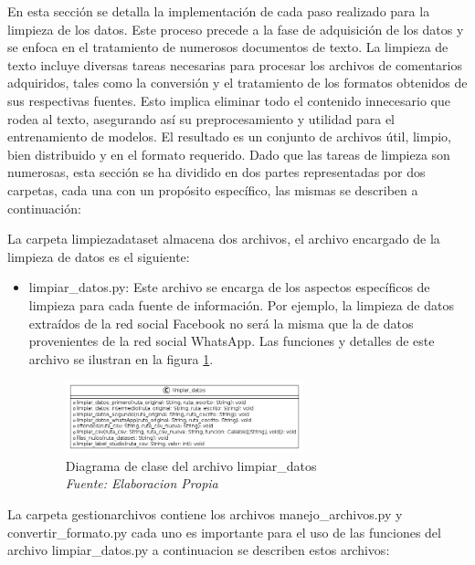 En esta sección se detalla la implementación de cada paso realizado para la limpieza de los datos. Este proceso precede a la fase de adquisición de los datos y se enfoca en el tratamiento de numerosos documentos de texto. La limpieza de texto incluye diversas tareas necesarias para procesar los archivos de comentarios adquiridos, tales como la conversión y el tratamiento de los formatos obtenidos de sus respectivas fuentes. Esto implica eliminar todo el contenido innecesario que rodea al texto, asegurando así su preprocesamiento y utilidad para el entrenamiento de modelos. El resultado es un conjunto de archivos útil, limpio, bien distribuido y en el formato requerido. Dado que las tareas de limpieza son numerosas, esta sección se ha dividido en dos partes representadas por dos carpetas, cada una con un propósito específico, las mismas se describen a continuación:

La carpeta limpiezadataset almacena dos archivos, el archivo encargado de la limpieza de datos es el siguiente:

\begin{itemize}

\item limpiar\_datos.py: Este archivo se encarga de los aspectos específicos de limpieza para cada fuente de información. Por ejemplo, la limpieza de datos extraídos de la red social Facebook no será la misma que la de datos provenientes de la red social WhatsApp. Las funciones y detalles de este archivo se ilustran en la figura \ref{fig:uml1}.

\begin{figure}[h!]
	\includegraphics[width=0.65\textwidth]{capitulo5/figuras/fig1.png}
	\caption{Diagrama de clase del archivo limpiar\_datos
		\\\textit{Fuente: Elaboracion Propia}}
	\label{fig:uml1}
\end{figure}

\end{itemize}


La carpeta gestionarchivos contiene los archivos manejo\_archivos.py y convertir\_formato.py cada uno es importante para el uso de las funciones del archivo limpiar\_datos.py a continuacion se describen estos archivos:

